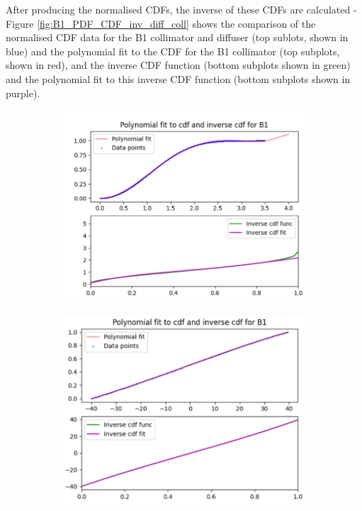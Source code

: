 After producing the normalised CDFs, the inverse of these CDFs are calculated - Figure \ref{fig:B1_PDF_CDF_inv_diff_coll} shows the comparison of the normalised CDF data for the B1 collimator and diffuser (top sublots, shown in blue) and the polynomial fit to the CDF for the B1 collimator (top subplots, shown in red), and the inverse CDF function (bottom subplots shown in green) and the polynomial fit to this inverse CDF function (bottom subplots shown in purple). 

\begin{figure}
    \centering
    \begin{subfigure}{0.5\textwidth}
        \centering
        \includegraphics[width=\textwidth]{Figures/B1_inv_coll_cdf.png} %
    \end{subfigure}\hfill
    \begin{subfigure}{0.5\textwidth}
        \centering
        \includegraphics[width=\textwidth]{Figures/B1_inv_diff_cdf.png} %

\end{subfigure}
\end{figure}
